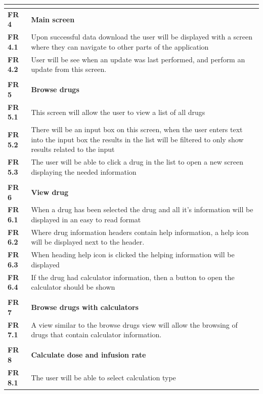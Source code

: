 \documentclass[11pt,fleqn,twoside]{article}
\begin{document}
\begin{center}
\begin{longtable}{| l | p{14.3cm} |}
\textbf{}  &  \\ \hline
\textbf{FR 4}   & \textbf{Main screen} \\ \hline
\textbf{FR 4.1} & Upon successful data download the user will be displayed with a screen where they can navigate to other parts of the application   \\ \hline
\textbf{FR 4.2} & User will be see when an update was last performed, and perform an update from this screen.\\ \hline
\textbf{}  &  \\ \hline
\textbf{FR 5}   & \textbf{Browse drugs}\\ \hline
\textbf{FR 5.1} & This screen will allow the user to view a list of all drugs  \\ \hline
\textbf{FR 5.2} & There will be an input box on this screen, when the user enters text into the input box the results in the list will be filtered to only show results related to the input \\ \hline
\textbf{FR 5.3} & The user will be able to click a drug in the list to open a new screen displaying the needed information  \\ \hline
\textbf{}  &  \\ \hline
\textbf{FR 6}   & \textbf{View drug}   \\ \hline
\textbf{FR 6.1} & When a drug has been selected the drug and all it’s information will be displayed in an easy to read format    \\ \hline
\textbf{FR 6.2} & Where drug information headers contain help information, a help icon will be displayed next to the header.\\ \hline
\textbf{FR 6.3} & When heading help icon is clicked the helping information will be displayed \\ \hline
\textbf{FR 6.4} & If the drug had calculator information, then a button to open the calculator should be shown    \\ \hline
\textbf{}  &  \\ \hline
\textbf{FR 7}   & \textbf{Browse drugs with calculators}   \\ \hline
\textbf{FR 7.1} & A view similar to the browse drugs view will allow the browsing of drugs that contain calculator information.  \\ \hline
\textbf{}  &  \\ \hline
\textbf{FR 8}   & \textbf{Calculate dose and infusion rate}\\ \hline
\textbf{FR 8.1} & The user will be able to select calculation type   \\ \hline

\end{longtable}
\end{center}
\end{document}
